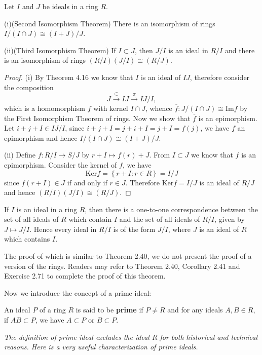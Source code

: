 \begin{theorem}
Let $I$ and $J$ be ideals in a ring $R$.\par
(i)(Second Isomorphism Theorem) There is an isomorphism of rings $I/(I\cap J)\cong(I+J)/J$.\par
(ii)(Third Isomorphism Theorem) If $I\subset J$, then $J/I$ is an ideal in $R/I$ and there is an isomorphism of rings $(R/I)(J/I)\cong(R/J)$.
\end{theorem}
\begin{proof}
(i) By Theorem 4.16 we know that $I$ is an ideal of $IJ$, therefore consider the composition 
$$
J\overset{\subset}{\longrightarrow}IJ\overset{\pi}{\longrightarrow}IJ/I,
$$
which is a homomorphism $f$ with kernel $I\cap J$, whence $\overline{f}:J/(I\cap J)\cong\mathrm{Im}f$ by the First Isomorphism Theorem of rings. Now we show that $\overline{f}$ is an epimorphism. Let $i+j+I\in IJ/I$, since $i+j+I=j+i+I=j+I=f(j)$, we have $f$ an epimorphism and hence $I/(I\cap J)\cong(I+J)/J$.\par
(ii) Define $f:R/I\rightarrow S/J$ by $r+I\mapsto f(r)+J$. From $I\subset J$ we know that $f$ is an epimorphism. Consider the kernel of $f$, we have 
$$
\mathrm{Ker}f=\left\{ r+I:r\in R \right\} =I/J
$$
since $f(r+I)\in J$ if and only if $r\in J$. Therefore $\mathrm{Ker}f=I/J$ is an ideal of $R/J$ and hence $(R/I)(J/I)\cong(R/J)$.
\end{proof}
\begin{theorem}
If $I$ is an ideal in a ring $R$, then there is a one-to-one correspondence between the set of all ideals of $R$ which contain $I$ and the set of all ideals of $R/I$, given by $J\mapsto J/I$. Hence every ideal in $R/I$ is of the form $J/I$, where $J$ is an ideal of $R$ which contains $I$.
\end{theorem}
The proof of which is similar to Theorem 2.40, we do not present the proof of a version of the rings. Readers may refer to Theorem 2.40, Corollary 2.41 and Exercise 2.71 to complete the proof of this theorem.\par
Now we introduce the concept of a prime ideal:
\begin{definition}
An ideal $P$ of a ring $R$ is said to be \textbf{prime} if $P\ne R$ and for any ideals $A,B\in R$, if $AB\subset P$, we have $A\subset P$ or $B\subset P$.
\end{definition}
\begin{note}\em
The definition of prime ideal excludes the ideal $R$ for both historical and technical reasons. Here is a very useful characterization of prime ideals.
\end{note}
